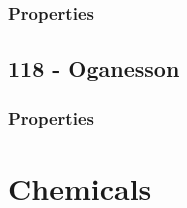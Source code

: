 \documentclass{book}
\begin{document}
\subsection{Properties}

\section{118 - Oganesson}
\label{sec:elem-oganesson}
\subsection{Properties}

\chapter{Chemicals}
\end{document}

